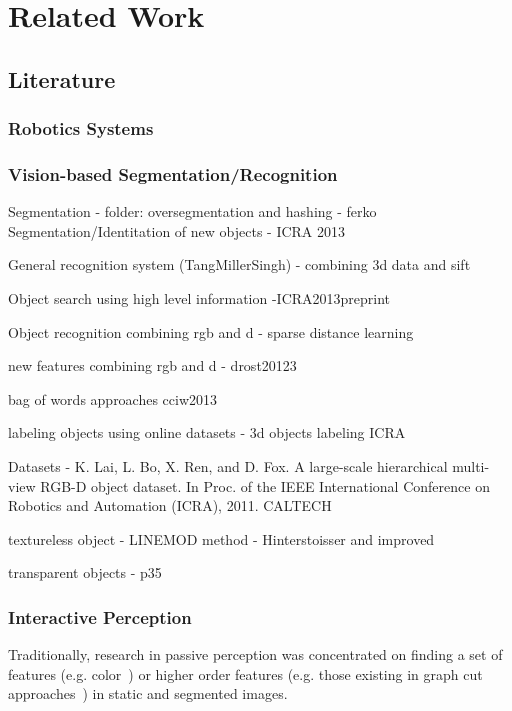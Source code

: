 \chapter{Related Work}
\label{chapter:Related Work}


\section{Literature}
\subsection{Robotics Systems}
\subsection{Vision-based Segmentation/Recognition}

Segmentation - folder: oversegmentation and hashing - ferko
Segmentation/Identitation of new objects - ICRA 2013

General recognition system (TangMillerSingh) - combining 3d data and sift

Object search using high level information -ICRA2013preprint

Object recognition combining rgb and d - sparse distance learning

new features combining rgb and d - drost20123

bag of words approaches cciw2013

labeling objects using online datasets - 3d objects labeling ICRA

Datasets - K. Lai, L. Bo, X. Ren, and D. Fox. A large-scale hierarchical multi-
view RGB-D object dataset. In Proc. of the IEEE International Conference on Robotics and Automation (ICRA), 2011. CALTECH


textureless object - LINEMOD method - Hinterstoisser and improved

transparent objects - p35






\subsection{Interactive Perception}

Traditionally, research in passive perception was concentrated on finding a set of features (e.g. color~\cite{Balch_2000_3584}) or higher order features (e.g. those existing in graph cut approaches~\cite{BoykovGraphCut}) in static and segmented images.

